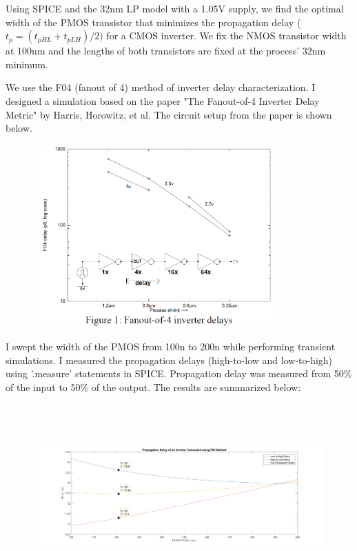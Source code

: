\documentclass[11pt]{article}
\begin{document}
Using SPICE and the 32nm LP model with a 1.05V supply, we find the optimal width of the PMOS transistor that minimizes the propagation delay ($t_{p} = (t_{pHL} + t_{pLH}) / 2)$ for a CMOS inverter. We fix the NMOS transistor width at 100nm and the lengths of both transistors are fixed at the process' 32nm minimum.

We use the F04 (fanout of 4) method of inverter delay characterization. I designed a simulation based on the paper "The Fanout-of-4 Inverter Delay Metric" by Harris, Horowitz, et al. The circuit setup from the paper is shown below.

\begin{figure}[H]
	\centerline{\includegraphics[height=7cm]{images/f04_figure.png}}
\end{figure}

I swept the width of the PMOS from 100n to 200n while performing transient simulations. I measured the propagation delays (high-to-low and low-to-high) using '.measure' statements in SPICE. Propagation delay was measured from 50\% of the input to 50\% of the output. The results are summarized below:

\begin{figure}[H]
	\centerline{\includegraphics[height=7cm]{images/inverter_delay.png}}
\end{figure}
\end{document}
